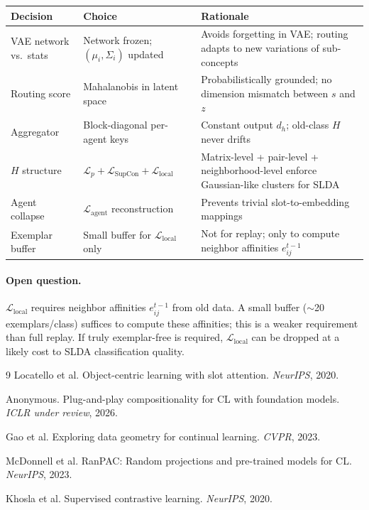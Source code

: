 \documentclass[11pt,a4paper]{article}
\newcommand{\Lcal}{\mathcal{L}}
\begin{document}
\begin{center}
\renewcommand{\arraystretch}{1.3}
\begin{tabular}{p{4cm}p{5cm}p{5cm}}
\toprule
\textbf{Decision} & \textbf{Choice} & \textbf{Rationale} \\
\midrule
VAE network vs.\ stats & Network frozen; $(\mu_i,\Sigma_i)$ updated & Avoids forgetting in VAE; routing adapts to new variations of sub-concepts \\
Routing score & Mahalanobis in latent space & Probabilistically grounded; no dimension mismatch between $s$ and $z$ \\
Aggregator & Block-diagonal per-agent keys & Constant output $d_h$; old-class $H$ never drifts \\
$H$ structure & $\Lcal_p + \Lcal_{\mathrm{SupCon}} + \Lcal_{\mathrm{local}}$ & Matrix-level + pair-level + neighborhood-level enforce Gaussian-like clusters for SLDA \\
Agent collapse & $\Lcal_{\mathrm{agent}}$ reconstruction & Prevents trivial slot-to-embedding mappings \\
Exemplar buffer & Small buffer for $\Lcal_{\mathrm{local}}$ only & Not for replay; only to compute neighbor affinities $e^{t-1}_{ij}$ \\
\bottomrule
\end{tabular}
\end{center}

\paragraph{Open question.}
$\Lcal_{\mathrm{local}}$ requires neighbor affinities $e^{t-1}_{ij}$ from old data.
A small buffer ($\sim$20 exemplars/class) suffices to compute these affinities;
this is a weaker requirement than full replay.
If truly exemplar-free is required, $\Lcal_{\mathrm{local}}$ can be dropped
at a likely cost to SLDA classification quality.


\begin{thebibliography}{9}
Locatello et al. Object-centric learning with slot attention. \emph{NeurIPS}, 2020.

Anonymous. Plug-and-play compositionality for CL with foundation models. \emph{ICLR under review}, 2026.

Gao et al. Exploring data geometry for continual learning. \emph{CVPR}, 2023.

McDonnell et al. RanPAC: Random projections and pre-trained models for CL. \emph{NeurIPS}, 2023.

Khosla et al. Supervised contrastive learning. \emph{NeurIPS}, 2020.
\end{thebibliography}
\end{document}
